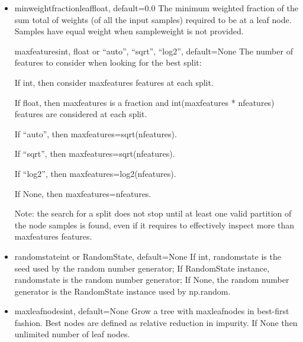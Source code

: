 \documentclass[12pt]{article}
\begin{document}
\begin{itemize}
If int, then consider min\textunderscore samples\textunderscore leaf as the minimum number.

If float, then min\textunderscore samples\textunderscore leaf is a fraction and ceil(min\textunderscore samples\textunderscore leaf * n\textunderscore samples) are the minimum number of samples for each node.

\item
min\textunderscore weight\textunderscore fraction\textunderscore leaffloat, default=0.0
The minimum weighted fraction of the sum total of weights (of all the input samples) required to be at a leaf node. Samples have equal weight when sample\textunderscore weight is not provided.

max\textunderscore featuresint, float or {“auto”, “sqrt”, “log2”}, default=None
The number of features to consider when looking for the best split:

If int, then consider max\textunderscore features features at each split.

If float, then max\textunderscore features is a fraction and int(max\textunderscore features * n\textunderscore features) features are considered at each split.

If “auto”, then max\textunderscore features=sqrt(n\textunderscore features).

If “sqrt”, then max\textunderscore features=sqrt(n\textunderscore features).

If “log2”, then max\textunderscore features=log2(n\textunderscore features).

If None, then max\textunderscore features=n\textunderscore features.

Note: the search for a split does not stop until at least one valid partition of the node samples is found, even if it requires to effectively inspect more than max\textunderscore features features.


\item
random\textunderscore stateint or RandomState, default=None
If int, random\textunderscore state is the seed used by the random number generator; If RandomState instance, random\textunderscore state is the random number generator; If None, the random number generator is the RandomState instance used by np.random.


\item
max\textunderscore leaf\textunderscore nodesint, default=None
Grow a tree with max\textunderscore leaf\textunderscore nodes in best-first fashion. Best nodes are defined as relative reduction in impurity. If None then unlimited number of leaf nodes.


\end{itemize}
\end{document}
